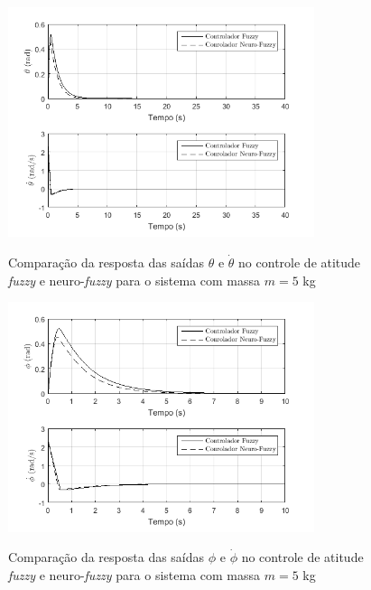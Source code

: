 \begin{figure}[!htb]
    \centering
    \caption{Comparação da resposta das saídas $\theta$ e $\dot{\theta}$ no controle de atitude \textit{fuzzy} e neuro-\textit{fuzzy} para o sistema com massa $m=5$ kg}
    \includegraphics[width=0.8\textwidth]{./04-figuras/resultados/novos/atitude_theta_thetadot_5kg_40s}
    \label{fig:atitude_theta_thetadot_5kg_40s}
\end{figure}

\begin{figure}[!htb]
    \centering
    \caption{Comparação da resposta das saídas $\phi$ e $\dot{\phi}$ no controle de atitude \textit{fuzzy} e neuro-\textit{fuzzy} para o sistema com massa $m=5$ kg}
    \includegraphics[width=0.8\textwidth]{./04-figuras/resultados/novos/atitude_phi_phidot_5kg_10s}
    \label{fig:atitude_phi_phidot_5kg_10s}
\end{figure}

